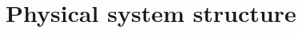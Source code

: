 \documentclass[../main/report.tex]{subfiles}
\begin{document}
\section{Physical system structure}

\end{document}
